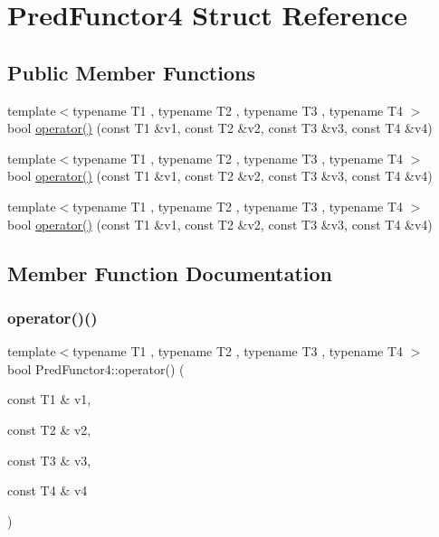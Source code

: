 \hypertarget{struct_pred_functor4}{}\section{Pred\+Functor4 Struct Reference}
\label{struct_pred_functor4}
\subsection*{Public Member Functions}
\begin{DoxyCompactItemize}
\item 
{\footnotesize template$<$typename T1 , typename T2 , typename T3 , typename T4 $>$ }\\bool \mbox{\hyperlink{struct_pred_functor4_a6cfb6ccd9a66bf93d9c43a49575e3869}{operator()}} (const T1 \&v1, const T2 \&v2, const T3 \&v3, const T4 \&v4)
\item 
{\footnotesize template$<$typename T1 , typename T2 , typename T3 , typename T4 $>$ }\\bool \mbox{\hyperlink{struct_pred_functor4_a6cfb6ccd9a66bf93d9c43a49575e3869}{operator()}} (const T1 \&v1, const T2 \&v2, const T3 \&v3, const T4 \&v4)
\item 
{\footnotesize template$<$typename T1 , typename T2 , typename T3 , typename T4 $>$ }\\bool \mbox{\hyperlink{struct_pred_functor4_a6cfb6ccd9a66bf93d9c43a49575e3869}{operator()}} (const T1 \&v1, const T2 \&v2, const T3 \&v3, const T4 \&v4)
\end{DoxyCompactItemize}


\subsection{Member Function Documentation}
\mbox{\label{struct_pred_functor4_a6cfb6ccd9a66bf93d9c43a49575e3869}} 
\subsubsection{\texorpdfstring{operator()()}{operator()()}\hspace{0.1cm}{\footnotesize\ttfamily [1/3]}}
{\footnotesize\ttfamily template$<$typename T1 , typename T2 , typename T3 , typename T4 $>$ \\
bool Pred\+Functor4\+::operator() (\begin{DoxyParamCaption}\item[{const T1 \&}]{v1,  }\item[{const T2 \&}]{v2,  }\item[{const T3 \&}]{v3,  }\item[{const T4 \&}]{v4 }\end{DoxyParamCaption})\hspace{0.3cm}{\ttfamily [inline]}}


